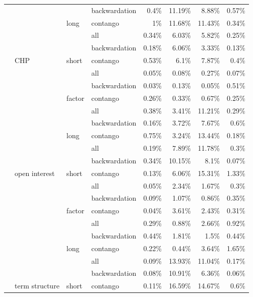 \documentclass[]{elsarticle} %
\begin{document}
\begin{longtable}[t]{>{}llllrrrr}
\nopagebreak
 &  &  & backwardation & 0.4\% & 11.19\% & 8.88\% & 0.57\%\\
\nopagebreak
 &  & \multirow[t]{-3}{*}{\raggedright\arraybackslash long} & contango & 1\% & 11.68\% & 11.43\% & 0.34\%\\
\nopagebreak
 &  &  & all & 0.34\% & 6.03\% & 5.82\% & 0.25\%\\
\nopagebreak
 &  &  & backwardation & 0.18\% & 6.06\% & 3.33\% & 0.13\%\\
\nopagebreak
 & \multirow[t]{-9}{*}{\raggedright\arraybackslash CHP} & \multirow[t]{-3}{*}{\raggedright\arraybackslash short} & contango & 0.53\% & 6.1\% & 7.87\% & 0.4\%\\
\nopagebreak
 &  &  & all & 0.05\% & 0.08\% & 0.27\% & 0.07\%\\
\nopagebreak
 &  &  & backwardation & 0.03\% & 0.13\% & 0.05\% & 0.51\%\\
\nopagebreak
 &  & \multirow[t]{-3}{*}{\raggedright\arraybackslash factor} & contango & 0.26\% & 0.33\% & 0.67\% & 0.25\%\\
\nopagebreak
 &  &  & all & 0.38\% & 3.41\% & 11.21\% & 0.29\%\\
\nopagebreak
 &  &  & backwardation & 0.16\% & 3.72\% & 7.67\% & 0.6\%\\
\nopagebreak
 &  & \multirow[t]{-3}{*}{\raggedright\arraybackslash long} & contango & 0.75\% & 3.24\% & 13.44\% & 0.18\%\\
\nopagebreak
 &  &  & all & 0.19\% & 7.89\% & 11.78\% & 0.3\%\\
\nopagebreak
 &  &  & backwardation & 0.34\% & 10.15\% & 8.1\% & 0.07\%\\
\nopagebreak
 & \multirow[t]{-9}{*}{\raggedright\arraybackslash open interest} & \multirow[t]{-3}{*}{\raggedright\arraybackslash short} & contango & 0.13\% & 6.06\% & 15.31\% & 1.33\%\\
\nopagebreak
 &  &  & all & 0.05\% & 2.34\% & 1.67\% & 0.3\%\\
\nopagebreak
 &  &  & backwardation & 0.09\% & 1.07\% & 0.86\% & 0.35\%\\
\nopagebreak
 &  & \multirow[t]{-3}{*}{\raggedright\arraybackslash factor} & contango & 0.04\% & 3.61\% & 2.43\% & 0.31\%\\
\nopagebreak
 &  &  & all & 0.29\% & 0.88\% & 2.66\% & 0.92\%\\
\nopagebreak
 &  &  & backwardation & 0.44\% & 1.81\% & 1.5\% & 0.44\%\\
\nopagebreak
 &  & \multirow[t]{-3}{*}{\raggedright\arraybackslash long} & contango & 0.22\% & 0.44\% & 3.64\% & 1.65\%\\
\nopagebreak
 &  &  & all & 0.09\% & 13.93\% & 11.04\% & 0.17\%\\
\nopagebreak
 &  &  & backwardation & 0.08\% & 10.91\% & 6.36\% & 0.06\%\\
\nopagebreak
\multirow[t]{-30}{*}{\raggedright\arraybackslash \textbf{term structure}} & \multirow[t]{-9}{*}{\raggedright\arraybackslash term structure} & \multirow[t]{-3}{*}{\raggedright\arraybackslash short} & contango & 0.11\% & 16.59\% & 14.67\% & 0.6\%\\*
\end{longtable}
\endgroup{}
\end{document}
